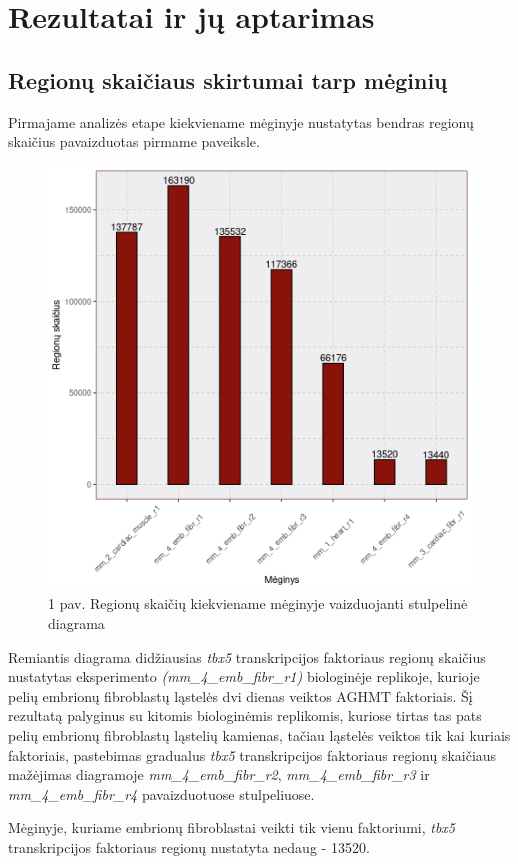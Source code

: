 \documentclass[12pt]{article}
\begin{document}
\section{Rezultatai ir jų aptarimas}
\subsection{Regionų skaičiaus skirtumai tarp mėginių}
Pirmajame analizės etape kiekviename mėginyje nustatytas bendras
regionų skaičius pavaizduotas pirmame paveiksle.

\begin{figure}[htb]
    \begin{center}
        \includegraphics[width=0.7\linewidth]{Figures/total_peak_counts.png}
        \caption*{1 pav. Regionų skaičių kiekviename mėginyje
        vaizduojanti stulpelinė diagrama}
    \end{center}
\end{figure}

Remiantis diagrama didžiausias \emph{tbx5} transkripcijos faktoriaus
regionų skaičius nustatytas eksperimento \emph{(mm\_4\_emb\_fibr\_r1)}
biologinėje replikoje, kurioje pelių embrionų fibroblastų ląstelės
dvi dienas veiktos AGHMT faktoriais.
Šį rezultatą palyginus su kitomis biologinėmis replikomis, kuriose
tirtas tas pats pelių embrionų fibroblastų ląstelių kamienas, tačiau
ląstelės veiktos tik kai kuriais faktoriais, pastebimas gradualus
\emph{tbx5} transkripcijos faktoriaus regionų skaičiaus mažėjimas
diagramoje \emph{mm\_4\_emb\_fibr\_r2}, \emph{mm\_4\_emb\_fibr\_r3} ir
\emph{mm\_4\_emb\_fibr\_r4} pavaizduotuose stulpeliuose.

Mėginyje, kuriame embrionų fibroblastai veikti tik vienu faktoriumi,
\emph{tbx5} transkripcijos faktoriaus regionų nustatyta nedaug -
13520.
\end{document}
